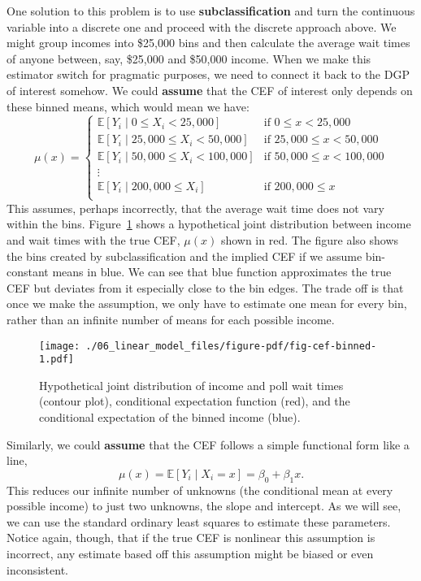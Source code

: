 \documentclass[
  letterpaper,
  DIV=11,
  numbers=noendperiod]{scrreprt}
\newcommand{\E}{\mathbb{E}}
\theoremstyle{definition}
\theoremstyle{plain}
\theoremstyle{definition}
\theoremstyle{remark}
\begin{document}
One solution to this problem is to use \textbf{subclassification} and
turn the continuous variable into a discrete one and proceed with the
discrete approach above. We might group incomes into \$25,000 bins and
then calculate the average wait times of anyone between, say, \$25,000
and \$50,000 income. When we make this estimator switch for pragmatic
purposes, we need to connect it back to the DGP of interest somehow. We
could \textbf{assume} that the CEF of interest only depends on these
binned means, which would mean we have:\\
\[
\mu(x) = 
\begin{cases}
  \E[Y_{i} \mid 0 \leq X_{i} < 25,000]  &\text{if }  0 \leq x < 25,000 \\
  \E[Y_{i} \mid 25,000 \leq X_{i} < 50,000]  &\text{if }  25,000 \leq x < 50,000\\
  \E[Y_{i} \mid 50,000 \leq X_{i} < 100,000]  &\text{if }  50,000 \leq x < 100,000\\
  \vdots \\
  \E[Y_{i} \mid 200,000 \leq X_{i}]  &\text{if }  200,000 \leq x\\
\end{cases}
\] This assumes, perhaps incorrectly, that the average wait time does
not vary within the bins. Figure~\ref{fig-cef-binned} shows a
hypothetical joint distribution between income and wait times with the
true CEF, \(\mu(x)\) shown in red. The figure also shows the bins
created by subclassification and the implied CEF if we assume
bin-constant means in blue. We can see that blue function approximates
the true CEF but deviates from it especially close to the bin edges. The
trade off is that once we make the assumption, we only have to estimate
one mean for every bin, rather than an infinite number of means for each
possible income.

\begin{figure}

{\centering \texttt{[image: ./06\_linear\_model\_files/figure-pdf/fig-cef-binned-1.pdf]}

}

\caption{\label{fig-cef-binned}Hypothetical joint distribution of income
and poll wait times (contour plot), conditional expectation function
(red), and the conditional expectation of the binned income (blue).}

\end{figure}

Similarly, we could \textbf{assume} that the CEF follows a simple
functional form like a line, \[ 
\mu(x) = \E[Y_{i}\mid X_{i} = x] = \beta_{0} + \beta_{1} x.
\] This reduces our infinite number of unknowns (the conditional mean at
every possible income) to just two unknowns, the slope and intercept. As
we will see, we can use the standard ordinary least squares to estimate
these parameters. Notice again, though, that if the true CEF is
nonlinear this assumption is incorrect, any estimate based off this
assumption might be biased or even inconsistent.
\end{document}
